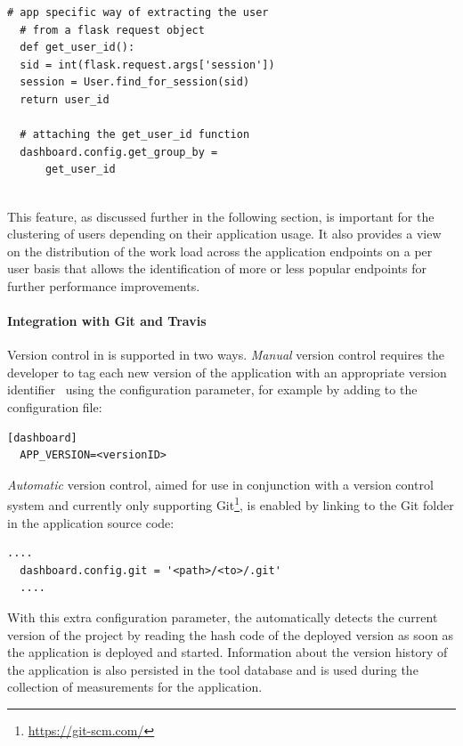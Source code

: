 \documentclass{sig-alternate-05-2015}
\begin{document}
  \begin{lstlisting}[style=custompython]  
  # app specific way of extracting the user
  # from a flask request object    
  def get_user_id():
  sid = int(flask.request.args['session'])
  session = User.find_for_session(sid)
  return user_id
  
  # attaching the get_user_id function
  dashboard.config.get_group_by = 
      get_user_id
  
  \end{lstlisting}
  This feature, as discussed further in the following section, is important for the clustering of users depending on their application usage. It also provides a view on the distribution of the work load across the application endpoints on a per user basis that allows the identification of more or less popular endpoints for further performance improvements.
  
  \paragraph{Integration with Git and Travis}
  
  Version control in \tool is supported in two ways. \textit{Manual} version control requires the developer to tag each new version of the application with an appropriate version identifier~\cite{papazoglou2011managing} using the  configuration parameter, for example by adding to the configuration file:
  
  \begin{lstlisting}[style=custompython]
  [dashboard]
  APP_VERSION=<versionID>
  \end{lstlisting}
  
  \textit{Automatic} version control, aimed for use in conjunction with a version control system and currently only supporting Git\footnote{\url{https://git-scm.com/}}, is enabled by linking to the Git folder in the application source code: 
  
  \begin{lstlisting}[style=custompython]
  ....
  dashboard.config.git = '<path>/<to>/.git'
  ....
  \end{lstlisting}  
  
  With this extra configuration parameter, the \tool automatically detects the current version of the project by reading the hash code of the deployed version as soon as the application is deployed and started. Information about the version history of the application is also persisted in the tool database and is used during the collection of measurements for the application.
  
\end{document}
